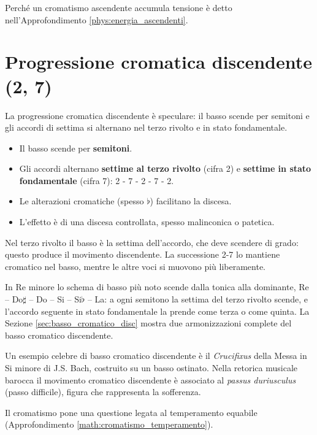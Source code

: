 Perché un cromatismo ascendente accumula tensione è detto nell'Approfondimento \ref{phys:energia_ascendenti}.

\section{Progressione cromatica discendente (2, 7)}
\label{subsec:progressione_cromatica_discendente}

La progressione cromatica discendente è speculare: il basso scende per semitoni e gli accordi di settima si alternano nel terzo rivolto e in stato fondamentale.

\begin{regola}
	\label{reg:progressione_cromatica_disc}
	\begin{itemize}
		\item Il basso scende per \textbf{semitoni}.
		\item Gli accordi alternano \textbf{settime al terzo rivolto} (cifra 2) e \textbf{settime in stato fondamentale} (cifra 7): 2 - 7 - 2 - 7 - 2.
		\item Le alterazioni cromatiche (spesso $\flat$) facilitano la discesa.
		\item L'effetto è di una discesa controllata, spesso malinconica o patetica.
	\end{itemize}
	Nel terzo rivolto il basso è la settima dell'accordo, che deve scendere di grado: questo produce il movimento discendente. La successione 2-7 lo mantiene cromatico nel basso, mentre le altre voci si muovono più liberamente.
\end{regola}

In Re minore lo schema di basso più noto scende dalla tonica alla dominante, Re -- Do$\sharp$ -- Do -- Si -- Si$\flat$ -- La: a ogni semitono la settima del terzo rivolto scende, e l'accordo seguente in stato fondamentale la prende come terza o come quinta. La Sezione \ref{sec:basso_cromatico_disc} mostra due armonizzazioni complete del basso cromatico discendente.

Un esempio celebre di basso cromatico discendente è il \textit{Crucifixus} della Messa in Si minore di J.S. Bach, costruito su un basso ostinato. Nella retorica musicale barocca il movimento cromatico discendente è associato al \textit{passus duriusculus} (passo difficile), figura che rappresenta la sofferenza.

Il cromatismo pone una questione legata al temperamento equabile (Approfondimento \ref{math:cromatismo_temperamento}).

